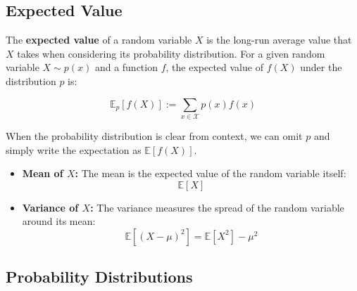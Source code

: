 \vspace{2em}

\subsection{Expected Value}

The \textbf{expected value} of a random variable \(X\) is the long-run average value that \(X\) takes when considering its probability distribution. For a given random variable \(X \sim p(x)\) and a function \(f\), the expected value of \(f(X)\) under the distribution \(p\) is:

\[
\mathbb{E}_p[f(X)] := \sum_{x \in \mathcal{X}} p(x) f(x)
\]

When the probability distribution is clear from context, we can omit \(p\) and simply write the expectation as \(\mathbb{E}[f(X)]\).

\begin{itemize}
    \item \textbf{Mean of \(X\):} The mean is the expected value of the random variable itself:
    \[
    \mathbb{E}[X]
    \]
    \item \textbf{Variance of \(X\):} The variance measures the spread of the random variable around its mean:
    \[
    \mathbb{E}[(X - \mu)^2] = \mathbb{E}[X^2] - \mu^2
    \]
\end{itemize}


\subsection{Probability Distributions}

